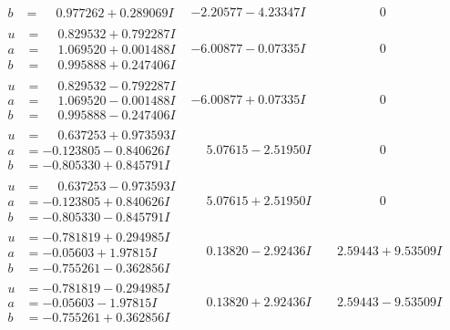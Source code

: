 \documentclass[1p]{elsarticle_modified}
\theoremstyle{definition}
\begin{document}
$$\begin{array}{c|c|c}
\begin{aligned}
b &= \phantom{-}0.977262 + 0.289069 I\end{aligned}
 & -2.20577 - 4.23347 I & \phantom{-0.000000 } 0 \\ \hline\begin{aligned}
u &= \phantom{-}0.829532 + 0.792287 I \\
a &= \phantom{-}1.069520 + 0.001488 I \\
b &= \phantom{-}0.995888 + 0.247406 I\end{aligned}
 & -6.00877 - 0.07335 I & \phantom{-0.000000 } 0 \\ \hline\begin{aligned}
u &= \phantom{-}0.829532 - 0.792287 I \\
a &= \phantom{-}1.069520 - 0.001488 I \\
b &= \phantom{-}0.995888 - 0.247406 I\end{aligned}
 & -6.00877 + 0.07335 I & \phantom{-0.000000 } 0 \\ \hline\begin{aligned}
u &= \phantom{-}0.637253 + 0.973593 I \\
a &= -0.123805 - 0.840626 I \\
b &= -0.805330 + 0.845791 I\end{aligned}
 & \phantom{-}5.07615 - 2.51950 I & \phantom{-0.000000 } 0 \\ \hline\begin{aligned}
u &= \phantom{-}0.637253 - 0.973593 I \\
a &= -0.123805 + 0.840626 I \\
b &= -0.805330 - 0.845791 I\end{aligned}
 & \phantom{-}5.07615 + 2.51950 I & \phantom{-0.000000 } 0 \\ \hline\begin{aligned}
u &= -0.781819 + 0.294985 I \\
a &= -0.05603 + 1.97815 I \\
b &= -0.755261 - 0.362856 I\end{aligned}
 & \phantom{-}0.13820 - 2.92436 I & \phantom{-}2.59443 + 9.53509 I \\ \hline\begin{aligned}
u &= -0.781819 - 0.294985 I \\
a &= -0.05603 - 1.97815 I \\
b &= -0.755261 + 0.362856 I\end{aligned}
 & \phantom{-}0.13820 + 2.92436 I & \phantom{-}2.59443 - 9.53509 I \\ \hline\begin{aligned}

\end{aligned}
\end{array}$$
\end{document}
